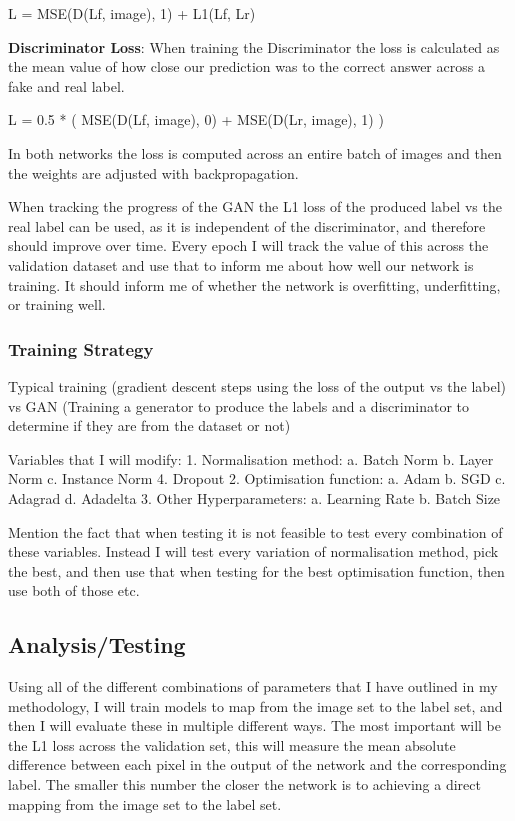 \documentclass[11pt]{article}
\begin{document}
L = MSE(D(Lf, image), 1) + L1(Lf, Lr) 

\textbf{Discriminator Loss}: When training the Discriminator the loss is calculated as the mean value of how close our prediction was to the correct answer across a fake and real label.

L = 0.5 * ( MSE(D(Lf, image), 0) + MSE(D(Lr, image), 1) ) 

In both networks the loss is computed across an entire batch of images and then the weights are adjusted with backpropagation.

When tracking the progress of the GAN the L1 loss of the produced label vs the real label can be used, as it is independent of the discriminator, and therefore should improve over time. Every epoch I will track the value of this across the validation dataset and use that to inform me about how well our network is training. It should inform me of whether the network is overfitting, underfitting, or training well. 

\subsubsection{Training Strategy}

Typical training (gradient descent steps using the loss of the output vs the label) vs GAN (Training a generator to produce the labels and a discriminator to determine if they are from the dataset or not)

Variables that I will modify:
1. Normalisation method:
a. Batch Norm
b. Layer Norm
c. Instance Norm
4. Dropout
2. Optimisation function:
a. Adam
b. SGD
c. Adagrad
d. Adadelta
3. Other Hyperparameters:
a. Learning Rate
b. Batch Size

Mention the fact that when testing it is not feasible to test every combination of these variables. Instead I will test every variation of normalisation method, pick the best, and then use that when testing for the best optimisation function, then use both of those etc. 

\subsection{Analysis/Testing}

Using all of the different combinations of parameters that I have outlined in my methodology, I will train models to map from the image set to the label set, and then I will evaluate these in multiple different ways. The most important will be the L1 loss across the validation set, this will measure the mean absolute difference between each pixel in the output of the network and the corresponding label. The smaller this number the closer the network is to achieving a direct mapping from the image set to the label set. 
\end{document}
